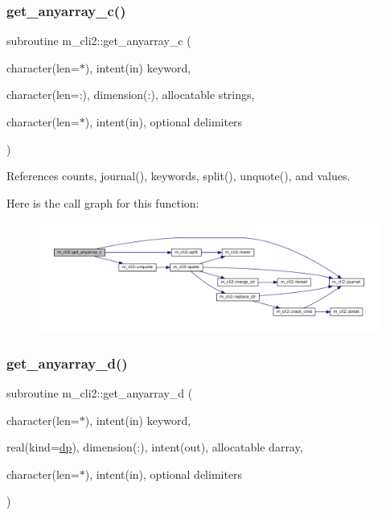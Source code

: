 \subsubsection{\texorpdfstring{get\+\_\+anyarray\+\_\+c()}{get\_anyarray\_c()}}
{\footnotesize\ttfamily subroutine m\+\_\+cli2\+::get\+\_\+anyarray\+\_\+c (\begin{DoxyParamCaption}\item[{character(len=$\ast$), intent(in)}]{keyword,  }\item[{character(len=\+:), dimension(\+:), allocatable}]{strings,  }\item[{character(len=$\ast$), intent(in), optional}]{delimiters }\end{DoxyParamCaption})\hspace{0.3cm}{\ttfamily [private]}}



References counts, journal(), keywords, split(), unquote(), and values.

Here is the call graph for this function\+:\nopagebreak
\begin{figure}[H]
\begin{center}
\leavevmode
\includegraphics[width=350pt]{namespacem__cli2_a448e8e24406f4bdbc14f26a940cbbc2c_cgraph}
\end{center}
\end{figure}
\mbox{\label{namespacem__cli2_aaede1f28172778cf45f4b6c04967bbbd}} 
\subsubsection{\texorpdfstring{get\+\_\+anyarray\+\_\+d()}{get\_anyarray\_d()}}
{\footnotesize\ttfamily subroutine m\+\_\+cli2\+::get\+\_\+anyarray\+\_\+d (\begin{DoxyParamCaption}\item[{character(len=$\ast$), intent(in)}]{keyword,  }\item[{real(kind=\mbox{\hyperlink{namespacem__cli2_acf83f1963cf6a56ad0221cfcf5402440}{dp}}), dimension(\+:), intent(out), allocatable}]{darray,  }\item[{character(len=$\ast$), intent(in), optional}]{delimiters }\end{DoxyParamCaption})\hspace{0.3cm}{\ttfamily [private]}}



